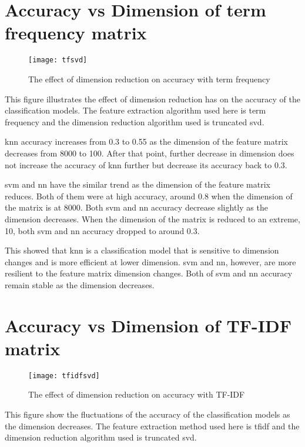 \section{Accuracy vs Dimension of term frequency matrix}
\begin{figure} [ht]
	\centering
	\texttt{[image: tfsvd]}
	\caption{The effect of dimension reduction on accuracy with term frequency}
	\label{fig:tfAcc}
\end{figure}

This figure illustrates the effect of dimension reduction has on the accuracy of the classification models. The feature extraction algorithm used here is term frequency and the dimension reduction algorithm used is truncated \ac{svd}.

\Ac{knn} accuracy increases from 0.3 to 0.55 as the dimension of the feature matrix decreases from 8000 to 100. After that point, further decrease in dimension does not increase the accuracy of \ac{knn} further but decrease its accuracy back to 0.3.

\Ac{svm} and \ac{nn} have the similar trend as the dimension of the feature matrix reduces. Both of them were at high accuracy, around 0.8 when the dimension of the matrix is at 8000. Both \ac{svm} and \ac{nn} accuracy decrease slightly as the dimension decreases. When the dimension of the matrix is reduced to an extreme, 10, both \ac{svm} and \ac{nn} accuracy dropped to around 0.3.

This showed that \ac{knn} is a classification model that is sensitive to dimension changes and is more efficient at lower dimension. \ac{svm} and \ac{nn}, however, are more resilient to the feature matrix dimension changes. Both of \ac{svm} and \ac{nn} accuracy remain stable as the dimension decreases.\\


\section{Accuracy vs Dimension of TF-IDF matrix}
\begin{figure} [ht]
	\centering
	\texttt{[image: tfidfsvd]}
	\caption{The effect of dimension reduction on accuracy with TF-IDF}
	\label{fig:tfidfAcc}
\end{figure}

This figure show the fluctuations of the accuracy of the classification models as the dimension decreases. The feature extraction method used here is \ac{tfidf} and the dimension reduction algorithm used is truncated \ac{svd}.

